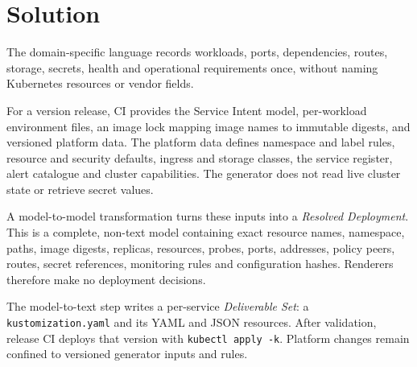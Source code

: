 \section{Solution}

The domain-specific language records workloads, ports, dependencies, routes,
storage, secrets, health and operational requirements once, without naming
Kubernetes resources or vendor fields.

For a version release, CI provides the Service Intent model, per-workload
environment files, an image lock mapping image names to immutable digests, and
versioned platform data. The platform data defines namespace and label rules,
resource and security defaults, ingress and storage classes, the service
register, alert catalogue and cluster capabilities. The generator does not read
live cluster state or retrieve secret values.

A model-to-model transformation turns these inputs into a \emph{Resolved
Deployment}. This is a complete, non-text model containing exact resource names,
namespace, paths, image digests, replicas, resources, probes, ports, addresses,
policy peers, routes, secret references, monitoring rules and configuration
hashes. Renderers therefore make no deployment decisions.

The model-to-text step writes a per-service \emph{Deliverable Set}: a
\texttt{kustomization.yaml} and its YAML and JSON resources. After validation,
release CI deploys that version with \texttt{kubectl apply -k}. Platform changes
remain confined to versioned generator inputs and rules.
